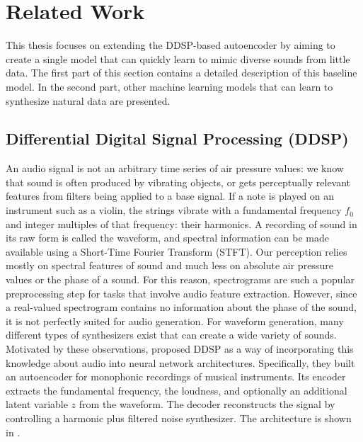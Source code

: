 
\chapter{Related Work}
\label{related}


This thesis focuses on extending the DDSP-based autoencoder by \cite{ddsp} aiming to create a single model that can quickly learn to mimic diverse sounds from little data.
The first part of this section contains a detailed description of this baseline model.
In the second part, other machine learning models that can learn to synthesize natural data are presented.



\section{Differential Digital Signal Processing (DDSP)}
An audio signal is not an arbitrary time series of air pressure values: we know that sound is often produced by vibrating objects, or gets perceptually relevant features from filters being applied to a base signal.
If a note is played on an instrument such as a violin, the strings vibrate with a fundamental frequency $f_0$ and integer multiples of that frequency: their harmonics.
A recording of sound in its raw form is called the waveform, and spectral information can be made available using a Short-Time Fourier Transform (STFT).
Our perception relies mostly on spectral features of sound and much less on absolute air pressure values or the phase of a sound. For this reason, spectrograms are such a popular preprocessing step for tasks that involve audio feature extraction. \newline
However, since a real-valued spectrogram contains no information about the phase of the sound, it is not perfectly suited for audio generation.
For waveform generation, many different types of synthesizers exist that can create a wide variety of sounds. \newline
Motivated by these observations, \citet{ddsp} proposed DDSP as a way of incorporating this knowledge about audio into neural network architectures.
Specifically, they built an autoencoder for monophonic recordings of musical instruments.
Its encoder extracts the fundamental frequency, the loudness, and optionally an additional latent variable $z$ from the waveform. The decoder reconstructs the signal by controlling a harmonic plus filtered noise synthesizer.
The architecture is shown in .\newline


